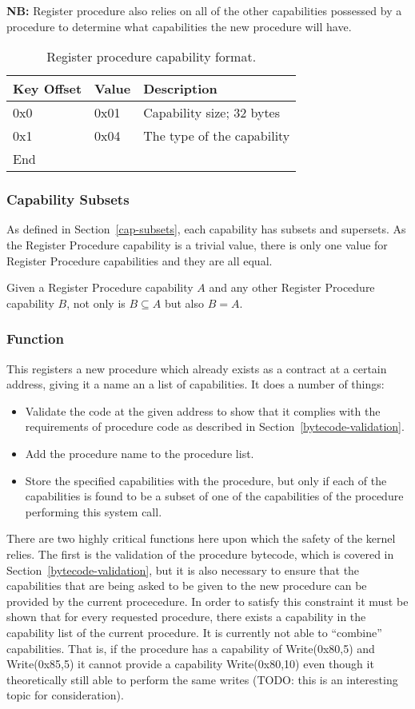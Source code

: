 \documentclass[english,a4paper]{article}
\let\oldparagraph\subsubsection
\renewcommand{\subsubsection}[1]{\oldparagraph{#1}\mbox{}}
\begin{document}
\textbf{NB:} Register procedure also relies on all of the other capabilities
possessed by a procedure to determine what capabilities the new procedure will
have.

\begin{table}[H]
  \caption{Register procedure capability format.}
  \centering{}%
  \begin{tabular}{l|l|p{}}
    \hline
    Key Offset & Value & Description\tabularnewline
    \hline
    \hline
    0x0 & 0x01 & Capability size; 32 bytes \tabularnewline
    0x1 & 0x04 & The type of the capability \tabularnewline
    \hline
    End &  \tabularnewline
    \hline
  \end{tabular}
\end{table}

\subsubsection{Capability Subsets}
As defined in Section~\ref{cap-subsets}, each capability has subsets and
supersets. As the Register Procedure capability is a trivial value, there is
only one value for Register Procedure capabilities and they are all equal.

Given a Register Procedure capability $A$ and any other Register Procedure
capability $B$, not only is $B \subseteq A$ but also $B = A$.

\subsubsection{Function}
This registers a new procedure which already exists as a contract at a certain
address, giving it a name an a list of capabilities. It does a number of things:

\begin{itemize}
  \item Validate the code at the given address to show that it complies with the
  requirements of procedure code as described in
  Section~\ref{bytecode-validation}.
  \item Add the procedure name to the procedure list.
  \item Store the specified capabilities with the procedure, but only if each of
  the capabilities is found to be a subset of one of the capabilities of the
  procedure performing this system call.
\end{itemize}

There are two highly critical functions here upon which the safety of the kernel
relies. The first is the validation of the procedure bytecode, which is covered
in Section~\ref{bytecode-validation}, but it is also necessary to ensure that
the capabilities that are being asked to be given to the new procedure can be
provided by the current procecedure. In order to satisfy this constraint it must
be shown that for every requested procedure, there exists a capability in the
capability list of the current procedure. It is currently not able to
``combine'' capabilities. That is, if the procedure has a capability of
Write(0x80,5) and Write(0x85,5) it cannot provide a capability Write(0x80,10)
even though it theoretically still able to perform the same writes (TODO: this
is an interesting topic for consideration).
\end{document}
